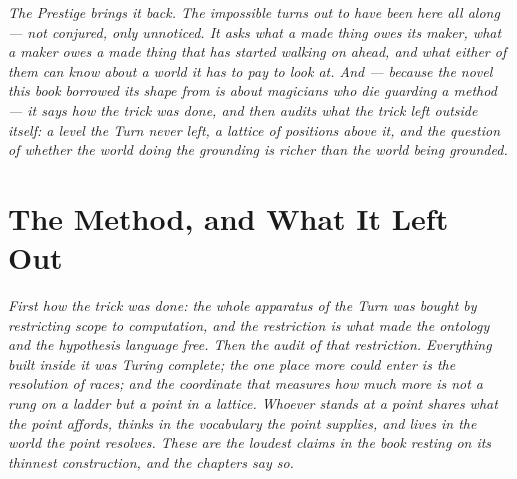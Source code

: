\documentclass[12pt,openright,twoside]{book}
\theoremstyle{remark}
\theoremstyle{plain}
\theoremstyle{remark}
\theoremstyle{plain}
\theoremstyle{plain}
\begin{document}
\vspace{1em}
\begin{mdframed}[backgroundcolor=remarkgray, linecolor=gray!60,
                 linewidth=1pt, topline=false, rightline=false,
                 bottomline=false]
\small\itshape
The Prestige brings it back.
The impossible turns out to have been here all along --- not conjured,
only unnoticed.
It asks what a made thing owes its maker, what a maker owes a made
thing that has started walking on ahead, and what either of them can
know about a world it has to pay to look at.
And --- because the novel this book borrowed its shape from is about
magicians who die guarding a method --- it says how the trick was
done, and then audits what the trick left outside itself: a level the
Turn never left, a lattice of positions above it, and the question of
whether the world doing the grounding is richer than the world being
grounded.
\end{mdframed}

\bigskip



\part{The Method, and What It Left Out}
\label{part:method}

\vspace{1em}
\begin{mdframed}[backgroundcolor=remarkgray, linecolor=gray!60,
                 linewidth=1pt, topline=false, rightline=false,
                 bottomline=false]
\small\itshape
First how the trick was done: the whole apparatus of the Turn was bought
by restricting scope to computation, and the restriction is what made the
ontology and the hypothesis language free.
Then the audit of that restriction.
Everything built inside it was Turing complete; the one place more could
enter is the resolution of races; and the coordinate that measures how
much more is not a rung on a ladder but a point in a lattice.
Whoever stands at a point shares what the point affords, thinks in the
vocabulary the point supplies, and lives in the world the point resolves.
These are the loudest claims in the book resting on its thinnest
construction, and the chapters say so.
\end{mdframed}
\end{document}
